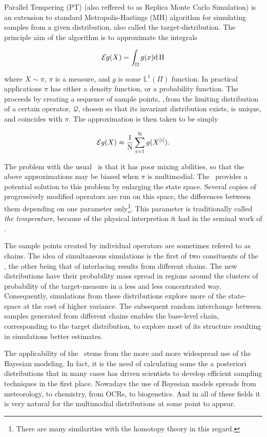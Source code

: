 
Parallel Tempering (PT) (also reffered to as Replica Monte Carlo Simulation) is an extension to standard Metropolis-Hastings (MH) algorithm for simulating samples from a given distribution, also called the target-distribution. The principle aim of the algorithm is to approximate the integrals 

\begin{equation}\label{mainGoal}
	\mathcal{E} g(X) = \int_\Omega g(x) \mathrm{d }\,\Pi
\end{equation}

where $X\sim \pi$, $\pi$ is a measure, and $g$ is some $\mathbb{L}^1(\Pi)$ function. In practical applications $\pi$ has either a density function, or a probability function. The \MH\, proceeds by creating a sequence of sample points, \sample,\,from the limiting distribution of a certain operator, $\mathcal{Q}$, chosen so that its invariant distribution exists, is unique, and coincides with $\pi$. The approximation is then taken to be simply

\begin{equation*}
	\mathcal{E} g(X) \approx \frac{1}{\mathrm{N}}\sum_{i = 1}^{\mathrm{N}} g(X^{[i]}).
\end{equation*}

The problem with the usual \MH\, is that it has poor mixing abilities, so that the above approximations may be biased when $\pi$ is multimodial. The \PT\, provides a potential solution to this problem by enlarging the state space. Several copies of progressively modified operators are run on this space, the differences between them depending on one parameter only\footnote{There are many similarities with the homotopy theory in this regard.}. This parameter is traditionally called {\it the temperature}, because of the physical interpretion it had in the seminal work of \citet{RobertSwendsen}. 

The sample points created by individual operators are sometimes refered to as chains. The idea of simultaneous simulations is the first of two consituents of the \PT, the other being that of interlacing results from different chains. The new distributions have their probability mass spread in regions around the clusters of probability of the target-measure in a less and less concentrated way. Consequently, simulations from these distributions explore more of the state-space at the cost of higher variance. The subsequent random interchange between samples generated from different chains enables the base-level chain, corresponding to the target distribution, to explore most of its structure resulting in simulations better estimates.

The applicability of the \PT\, stems from the more and more widespread use of the Bayesian modeling. In fact, it is the need of calculating some the a posteriori distributions that in many cases has driven scientists to develop efficient sampling techniques in the first place. Nowadays the use of Bayesian models spreads from meteorology, to chemistry, from OCRs, to biogenetics. And in all of these fields it is very natural for the multimodial distributions at some point to appear.